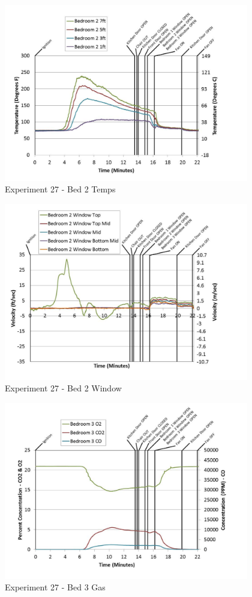 \documentclass{article}
\begin{document}
\begin{appendices}
	\begin{figure}[h!]
		\centering
		\includegraphics[height=3.05in]{0_Images/Results_Charts/Exp_27_Charts/Bed2Temps.pdf}
		\caption{Experiment 27 - Bed 2 Temps}
	\end{figure}
 
	\clearpage

	\begin{figure}[h!]
		\centering
		\includegraphics[height=3.05in]{0_Images/Results_Charts/Exp_27_Charts/Bed2Window.pdf}
		\caption{Experiment 27 - Bed 2 Window}
	\end{figure}
 

	\begin{figure}[h!]
		\centering
		\includegraphics[height=3.05in]{0_Images/Results_Charts/Exp_27_Charts/Bed3Gas.pdf}
		\caption{Experiment 27 - Bed 3 Gas}
	\end{figure}
 

\end{appendices}
\end{document}
